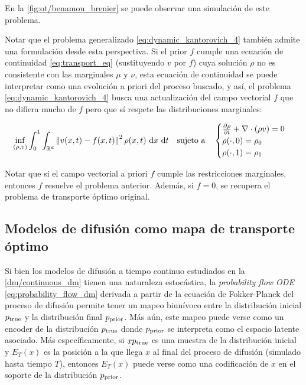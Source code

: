 En la \autoref{fig:ot/benamou_brenier} se puede observar una simulación de este problema.


Notar que el problema generalizado \eqref{eq:dynamic_kantorovich_4} también admite una formulación desde esta perspectiva. Si el prior $f$ cumple una ecuación de continuidad \eqref{eq:transport_eq} (sustituyendo $v$ por $f$) cuya solución $\rho$ no es consistente con las marginales $\mu$ y $\nu$, esta ecuación de continuidad se puede interpretar como una evolución a priori del proceso buscado, y así, el problema \eqref{eq:dynamic_kantorovich_4} busca una actualización del campo vectorial $f$ que no difiera mucho de $f$ pero que sí respete las distribuciones marginales:

\begin{equation*}
	\inf_{(\rho,v)} \int_0^1 \int_{\mathbb{R}^d} \left\lVert v(x,t)-f(x,t) \right\rVert^2 \rho(x,t) \,\operatorname{d}\! x\,\operatorname{d}\! t
	\quad \text{sujeto a} \quad
	\begin{cases}
		\frac{\partial \rho}{\partial t} + \nabla\cdot(\rho v) = 0\\
		\rho(\cdot,0) = \rho_0\\
		\rho(\cdot,1) = \rho_1
	\end{cases}
\end{equation*}

Notar que si el campo vectorial a priori $f$ cumple las restricciones marginales, entonces $f$ resuelve el problema anterior. Además, si $f=0$, se recupera el problema de transporte óptimo original.

\subsection{Modelos de difusión como mapa de transporte óptimo}
\label{ot/dynamic/dm}

Si bien los modelos de difusión a tiempo continuo estudiados en la \autoref{dm/continuous_dm} tienen una naturaleza estocástica, la \textit{probability flow ODE} \eqref{eq:probability_flow_dm} derivada a partir de la ecuación de Fokker-Planck del proceso de difusión permite tener un mapeo biunívoco entre la distribución inicial $p_{\operatorname{true}}$ y la distribución final $p_{\operatorname{prior}}$. Más aún, este mapeo puede verse como un encoder de la distribución $p_{\operatorname{true}}$ donde $p_{\operatorname{prior}}$ se interpreta como el espacio latente asociado. Más específicamente, si $xp_{\operatorname{true}}$ es una muestra de la distribución inicial y $E_T(x)$ es la posición a la que llega $x$ al final del proceso de difusión (simulado hasta tiempo $T$), entonces $E_T(x)$ puede verse como una codificación de $x$ en el soporte de la distribución $p_{\operatorname{prior}}$.

